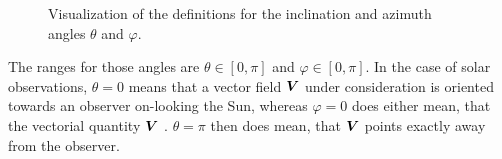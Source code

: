 \documentclass[a4paper,12pt]{report}
\def\lk#1{{\color{black}{#1}}}
\begin{document}
\begin{figure}[h]
\caption{Visualization of the definitions for the inclination and azimuth angles $\theta$ and $\varphi$.}
\label{fig:inclinationazimuth}
\end{figure} The ranges for those angles are $\theta \in [0,\pi]$ and $\varphi \in [0,\pi]$. In the case of solar observations, $\theta = 0$ means that a vector field $\bm{V}$ under consideration is oriented towards an observer on-looking the Sun, whereas $\varphi=0$ does either mean, that the vectorial quantity $\bm{V}$ \lk{faces either perfectly north or east on the solar surface, depending on the convention used by some author. In the experiments conducted for this thesis however, $\varphi = 0$ is identified with solar north, where the azimuth value $\varphi$ increases in clockwise direction}. $\theta=\pi$ then does mean, that $\bm{V}$ points exactly away from the observer.
\end{document}
